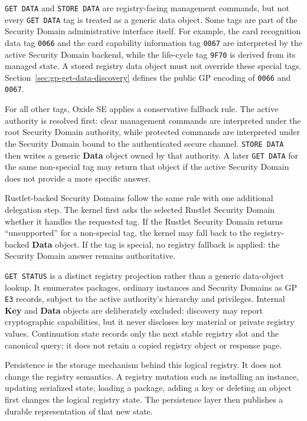 \texttt{GET DATA} and \texttt{STORE DATA} are registry-facing management
commands, but not every \texttt{GET DATA} tag is treated as a generic data
object. Some tags are part of the Security Domain administrative interface
itself. For example, the card recognition data tag \texttt{0066} and the
card capability information tag \texttt{0067} are interpreted by the active
Security Domain backend, while the life-cycle tag \texttt{9F70} is derived
from its managed state. A stored registry data object must not override these
special tags. Section~\ref{sec:gp-get-data-discovery} defines the public GP
encoding of \texttt{0066} and \texttt{0067}.

For all other tags, Oxide SE applies a conservative fallback rule. The
active authority is resolved first: clear management commands are interpreted
under the root Security Domain authority, while protected commands are
interpreted under the Security Domain bound to the authenticated secure
channel. \texttt{STORE DATA} then writes a generic \textbf{Data} object owned
by that authority. A later \texttt{GET DATA} for the same non-special tag may
return that object if the active Security Domain does not provide a more
specific answer.

Rustlet-backed Security Domains follow the same rule with one additional
delegation step. The kernel first asks the selected Rustlet Security Domain
whether it handles the requested tag. If the Rustlet Security Domain returns
``unsupported'' for a non-special tag, the kernel may fall back to the
registry-backed \textbf{Data} object. If the tag is special, no registry
fallback is applied: the Security Domain answer remains authoritative.

\texttt{GET STATUS} is a distinct registry projection rather than a generic
data-object lookup. It enumerates packages, ordinary instances and Security
Domains as GP \texttt{E3} records, subject to the active authority's hierarchy
and privileges. Internal \textbf{Key} and \textbf{Data} objects are deliberately
excluded: discovery may report cryptographic capabilities, but it never
discloses key material or private registry values. Continuation state records
only the next stable registry slot and the canonical query; it does not retain
a copied registry object or response page.

Persistence is the storage mechanism behind this logical registry. It does
not change the registry semantics. A registry mutation such as installing an
instance, updating serialized state, loading a package, adding a key or
deleting an object first changes the logical registry state. The persistence
layer then publishes a durable representation of that new state.

